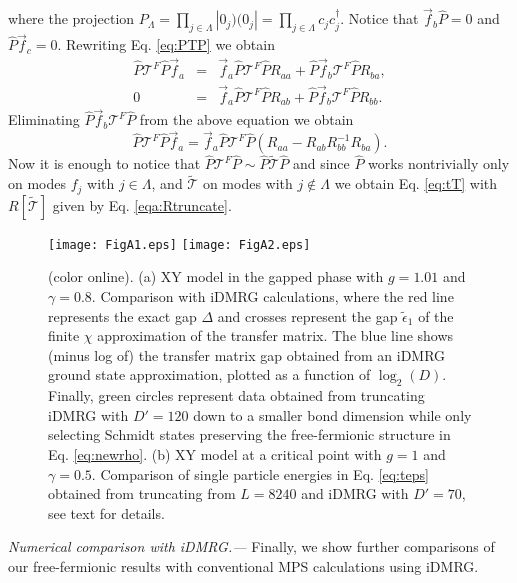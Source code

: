 \documentclass[prl,twocolumn,showpacs,floatfix,superscriptaddress,nofootinbib]{revtex4-1}
\begin{document}
\noindent where the projection $P_\Lambda =\prod_{j\in\Lambda}|0_j)(0_j|= \prod_{j\in\Lambda} c_j c_j^\dagger$. 
Notice that $\vec f_b \hat P =0$ and $\hat P \vec f_c  =0$.  
Rewriting Eq. \eqref{eq:PTP} we obtain 
\begin{eqnarray*}
\hat P \mathcal{T}^F \hat P \vec f_a &=& \vec f_a \hat P \mathcal{T}^F \hat P R_{aa} + \hat P \vec f_b\mathcal{T}^F \hat P R_{ba}, \\
0 &=& \vec f_a \hat P \mathcal{T}^F \hat P R_{ab} +\hat P \vec f_b\mathcal{T}^F \hat P R_{bb}. 
\end{eqnarray*}
Eliminating $\hat P \vec f_b\mathcal{T}^F \hat P$ from the above equation we obtain 
$$
\hat P \mathcal{T}^F \hat P \vec f_a  =  \vec f_a \hat P \mathcal{T}^F \hat P (R_{aa}  - R_{ab} R_{bb}^{-1} R_{ba}).
$$
Now it is enough to notice that $\hat P \mathcal{T}^F \hat P \sim  \hat  P \tilde{ \mathcal{T}} \hat P$ and since $\hat P$ works nontrivially only on modes $f_j$ with $j \in \Lambda$, and  $\tilde {\mathcal{T}}$ on modes with $j \notin \Lambda$ we obtain Eq. \eqref{eq:tT} with $R[\tilde {\mathcal{T}}]$ given by Eq. \eqref{eqa:Rtruncate}.

\begin{figure}[t] 
\begin{center}
\texttt{[image: FigA1.eps]}
\texttt{[image: FigA2.eps]}
\end{center}
\caption{(color online). (a) XY model in the gapped phase with $g=1.01$ and $\gamma = 0.8$.  Comparison with iDMRG calculations, where the red line represents the exact gap $\Delta$ and crosses represent the gap $\tilde \epsilon_1$ of the finite $\chi$ approximation of the transfer matrix. The blue line shows (minus log of) the transfer matrix gap obtained from an iDMRG ground state approximation, plotted as a function of $\log_2(D)$. Finally, green circles represent data obtained from truncating iDMRG with $D'=120$ down to a smaller bond dimension while only selecting Schmidt states preserving the free-fermionic structure in Eq. \eqref{eq:newrho}.
(b) XY model at a critical point with $g=1$ and $\gamma = 0.5$. Comparison of single particle energies in Eq. \eqref{eq:teps} obtained from truncating from $L=8240$ and iDMRG with $D'=70$, see text for details.}
\label{fig:Anum}
\end{figure}


{\it  Numerical comparison with {\rm iDMRG}.---} 
Finally, we show further comparisons of our free-fermionic results with conventional MPS calculations using iDMRG.
\end{document}
